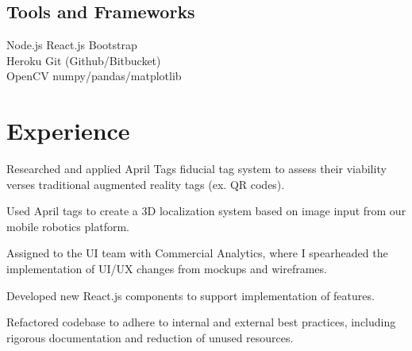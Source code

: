 \documentclass[]{deedy-resume-openfont}
\begin{document}
\begin{minipage}[t]{0.33\textwidth}
\subsection{Tools and Frameworks}
Node.js \textbullet{}   React.js \textbullet{} 
Bootstrap \textbullet{} \\
Heroku \textbullet{} 
Git (Github/Bitbucket) \\
OpenCV \textbullet numpy/pandas/matplotlib

\sectionsep




%
%

\end{minipage} 
\hfill
\begin{minipage}[t]{0.66\textwidth} 


\section{Experience}

\vspace{\topsep} %
\begin{tightemize}
\item Researched and applied April Tags fiducial tag system to assess their viability verses traditional augmented reality tags (ex. QR codes). 
\item Used April tags to create a 3D localization system based on image input from our mobile robotics platform.
\end{tightemize}
\sectionsep

\begin{tightemize}
\item Assigned to the UI team with Commercial Analytics, where I spearheaded the implementation of UI/UX changes from mockups and wireframes.
\item Developed new React.js components to support implementation of features.
\item Refactored codebase to adhere to internal and external best practices, including rigorous documentation and reduction of unused resources.
\end{tightemize}
\sectionsep





\end{minipage}
\end{document}
